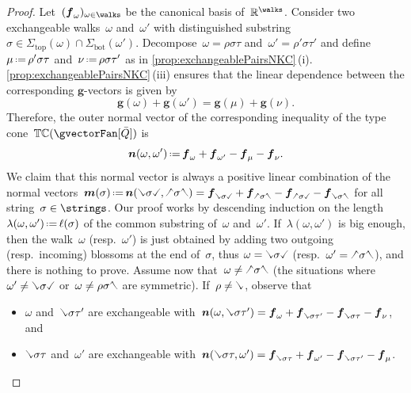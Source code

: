 \documentclass{amsart}
\theoremstyle{definition}
\newcommand{\R}{\mathbb{R}} %
\renewcommand{\b}[1]{{\boldsymbol{#1}}} %
\newcommand{\eqdef}{\mbox{\,\raisebox{0.2ex}{\scriptsize\ensuremath{\mathrm:}}\ensuremath{=}\,}} %
\newcommand{\gvector}[1]{\b{g}(#1)} %
\newcommand{\typeCone}{\mathbb{TC}} %
\newcommand{\quiver}{\bar Q} %
\renewcommand{\top}{\mathrm{top}} %
\newcommand{\bottom}{\mathrm{bot}} %
\newcommand{\hL}{\text{\rotatebox[origin=c]{180}{\checked}}}
\newcommand{\hR}{\text{\rotatebox[origin=c]{180}{\reflectbox{\checked}}}}
\newcommand{\cL}{\text{\reflectbox{\checked}}}
\newcommand{\cR}{\text{\checked}}
\newcommand{\hh}[1]{\hL#1\hR} %
\newcommand{\cc}[1]{\cL#1\cR} %
\newcommand{\hc}[1]{\hL#1\cR} %
\newcommand{\ch}[1]{\cL#1\hR} %
\begin{document}
\begin{proof}
Let~$(\b{f}_\omega)_{\omega \in \walks}$ be the canonical basis of~$\R^{\walks}$.
Consider two exchangeable walks~$\omega$ and~$\omega'$ with distinguished substring~$\sigma \in \Sigma_\top(\omega) \cap \Sigma_\bottom(\omega')$.
Decompose~$\omega = \rho \sigma \tau$ and~$\omega' = \rho' \sigma \tau'$ and define~$\mu \eqdef \rho' \sigma \tau$ and~$\nu \eqdef \rho \sigma \tau'$ as in \cref{prop:exchangeablePairsNKC}\,(i). \cref{prop:exchangeablePairsNKC}\,(iii) ensures that the linear dependence between the corresponding $\b{g}$-vectors is given by
\[
\gvector{\omega} + \gvector{\omega'} = \gvector{\mu} + \gvector{\nu}.
\]
Therefore, the outer normal vector of the corresponding inequality of the type cone~$\typeCone(\gvectorFan[\quiver])$ is
\[
\b{n}(\omega, \omega') \eqdef \b{f}_\omega + \b{f}_{\omega'} - \b{f}_\mu - \b{f}_\nu.
\]
We claim that this normal vector is always a positive linear combination of the normal vectors~$\b{m}(\sigma) \eqdef \b{n}(\cc{\sigma}, \hh{\sigma}) = \b{f}_{\cc{\sigma}} + \b{f}_{\hh{\sigma}} - \b{f}_{\hc{\sigma}} - \b{f}_{\ch{\sigma}}$ for all string~$\sigma \in \strings$.
Our proof works by descending induction on the length~$\lambda(\omega,\omega') \eqdef \ell(\sigma)$ of the common substring of~$\omega$ and~$\omega'$.
If~$\lambda(\omega, \omega')$ is big enough, then the walk~$\omega$ (resp.~$\omega'$) is just obtained by adding two outgoing (resp.~incoming) blossoms at the end of~$\sigma$, thus $\omega = \cc{\sigma}$ (resp.~$\omega' = \hh{\sigma}$), and there is nothing to prove.
Assume now that~$\omega \ne \hh{\sigma}$ (the situations where~$\omega' \ne \cc{\sigma}$ or~$\omega \ne \rho \sigma \hR$ are symmetric).
If~$\rho \ne \cL$, observe that
\begin{itemize}
\item $\omega$ and~$\cL \sigma \tau'$ are exchangeable with~$\b{n}(\omega, \cL \sigma \tau') = \b{f}_\omega + \b{f}_{\cL \sigma \tau'} - \b{f}_{\cL \sigma \tau} - \b{f}_\nu$, and
\item $\cL \sigma \tau$ and~$\omega'$ are exchangeable with~$\b{n}(\cL \sigma \tau, \omega') = \b{f}_{\cL \sigma \tau} + \b{f}_{\omega'} - \b{f}_{\cL \sigma \tau'} - \b{f}_\mu$.
\end{itemize}

\end{proof}
\end{document}
